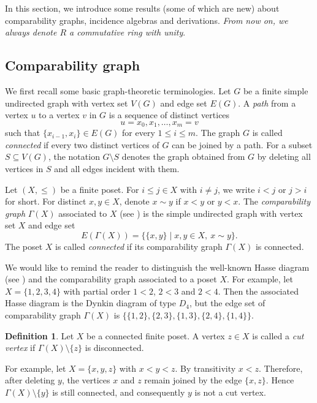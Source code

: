 \documentclass[reqno]{amsart}
\numberwithin{equation}{section}
\theoremstyle{plain}
\theoremstyle{definition}
\newtheorem{definition}[theorem]{Definition}
\begin{document}
In this section, we introduce some results (some of which are new) about
comparability graphs, incidence algebras and derivations.
{\em From now on, we always denote $R$ a commutative ring with unity}.

\subsection{Comparability graph}

We first recall some basic graph-theoretic terminologies. Let $G$ be
a finite simple undirected graph with vertex set $V(G)$ and edge
set $E(G)$. A \emph{path} from a vertex $u$ to a vertex $v$ in $G$
is a sequence of distinct vertices
\[
u=x_0,x_1,\ldots,x_m=v
\]
such that $\{x_{i-1},x_i\}\in E(G)$ for every $1\leq i\leq m$.
The graph $G$ is called \emph{connected} if every two distinct
vertices of $G$ can be joined by a path. For a subset $S\subseteq V(G)$, the notation $G\setminus S$
denotes the graph obtained from $G$ by deleting all vertices in
$S$ and all edges incident with them.

Let $(X,\leq)$ be a finite poset. For $i\leq j\in X$ with $i\neq j$, we write $i<j$ or $j>i$ for short.
For distinct $x,y\in X$, denote $x\sim y$ if $x<y$ or $y<x$.
The \emph{comparability graph} $\Gamma(X)$ associated to $X$ (see \cite[Chapter 5]{Gol})
is the simple undirected graph with vertex set $X$ and
edge set
\[
E(\Gamma(X))
 =\bigl\{\{x,y\} \mid x,y\in X,\ x\sim y\bigr\}.
\]
The poset $X$ is called \emph{connected} if its comparability graph
$\Gamma(X)$ is connected.

We would like to remind the reader to distinguish the well-known Hasse diagram (see \cite[\S 1.1]{SpDo})
and the comparability graph associated to a poset $X$. For example, let $X=\{1,2,3,4\}$
with partial order $1<2$, $2<3$ and $2<4$. Then the associated Hasse diagram is the Dynkin diagram of
type $D_4$, but the edge set of comparability graph $\Gamma(X)$ is
$\{\{1,2\}, \{2,3\}, \{1,3\}, \{2,4\}, \{1,4\}\}$.

\begin{definition}\label{def:cut-vertex}
Let $X$ be a connected finite poset. A vertex $z\in X$ is called a
\emph{cut vertex} if $\Gamma(X)\setminus\{z\}$ is disconnected.
\end{definition}

For example, let $X=\{x,y,z\}$ with $x<y<z$. By transitivity
$x<z$. Therefore, after deleting $y$, the vertices $x$ and $z$
remain joined by the edge $\{x,z\}$. Hence
$\Gamma(X)\setminus\{y\}$ is still connected, and consequently $y$ is
not a cut vertex.
\end{document}
